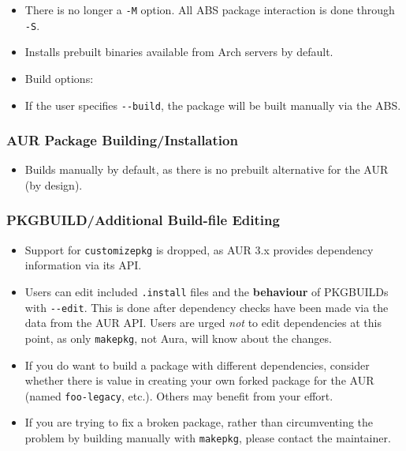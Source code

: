 \documentclass{article}
\begin{document}
\begin{itemize}
\itemsep1pt\parskip0pt
\item
  There is no longer a \texttt{-M} option. All ABS package interaction
  is done through \texttt{-S}.
\item
  Installs prebuilt binaries available from Arch servers by default.
\item
  Build options:
\item
  If the user specifies \texttt{-\/-build}, the package will be built
  manually via the ABS.
\end{itemize}

\subsubsection{AUR Package
Building/Installation}\label{aur-package-buildinginstallation}

\begin{itemize}
\itemsep1pt\parskip0pt
\item
  Builds manually by default, as there is no prebuilt alternative for
  the AUR (by design).
\end{itemize}

\subsubsection{PKGBUILD/Additional Build-file
Editing}\label{pkgbuildadditional-build-file-editing}

\begin{itemize}
\itemsep1pt\parskip0pt
\item
  Support for \texttt{customizepkg} is dropped, as AUR 3.x provides
  dependency information via its API.
\item
  Users can edit included \texttt{.install} files and the
  \textbf{behaviour} of PKGBUILDs with \texttt{-\/-edit}. This is done
  after dependency checks have been made via the data from the AUR API.
  Users are urged \emph{not} to edit dependencies at this point, as only
  \texttt{makepkg}, not Aura, will know about the changes.
\item
  If you do want to build a package with different dependencies,
  consider whether there is value in creating your own forked package
  for the AUR (named \texttt{foo-legacy}, etc.). Others may benefit from
  your effort.
\item
  If you are trying to fix a broken package, rather than circumventing
  the problem by building manually with \texttt{makepkg}, please contact
  the maintainer.
\end{itemize}
\end{document}
